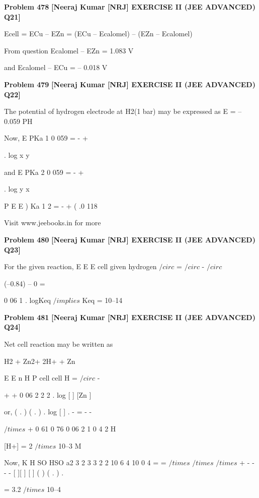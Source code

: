 \begin{problembox}
\textbf{Problem 478} \hfill \textbf{[Neeraj Kumar [NRJ] EXERCISE II (JEE ADVANCED) Q21]}
\label{q:ext-nrj_all_questions-478}

Ecell = ECu -- EZn = (ECu -- Ecalomel) -- (EZn -- Ecalomel)
 
 From question Ecalomel -- EZn = 1.083 V
 
 and Ecalomel -- ECu = -- 0.018 V
\end{problembox}

\begin{problembox}
\textbf{Problem 479} \hfill \textbf{[Neeraj Kumar [NRJ] EXERCISE II (JEE ADVANCED) Q22]}
\label{q:ext-nrj_all_questions-479}

The potential of hydrogen electrode at H2(1 bar) 
may be expressed as E = -- 0.059 PH
 
 Now, E
PKa
1
0 059
= -
+
 
  
 
  
.
log x
y 
 
 and E
PKa
2
0 059
= -
+
 
  
 
  
.
log y
x
 
   P
E
E )
Ka
1
2
= -
+
(
.0 118
 
 
Visit www.jeebooks.in for more
\end{problembox}

\begin{problembox}
\textbf{Problem 480} \hfill \textbf{[Neeraj Kumar [NRJ] EXERCISE II (JEE ADVANCED) Q23]}
\label{q:ext-nrj_all_questions-480}

For the given reaction, E
E
E
cell
given
hydrogen
$/circ$
=
$/circ$
-
$/circ$
 
   (--0.84) -- 0 =
 
0 06
1
.
logKeq $/implies$ Keq = 10--14
\end{problembox}

\begin{problembox}
\textbf{Problem 481} \hfill \textbf{[Neeraj Kumar [NRJ] EXERCISE II (JEE ADVANCED) Q24]}
\label{q:ext-nrj_all_questions-481}

Net cell reaction may be written as 
 
 H2 + Zn2+   2H+ + Zn
 
 
E
E
n
H
P
cell
cell
H
=
$/circ$
-
 
+
+
0 06
2
2
2
.
log
[
]
[Zn
]
 
 or, (
.
)
(
.
)
.
log [
]
.
-
= -
-
 
$/times$
+
0 61
0 76
0 06
2
1
0 4
2
H
 
   [H+] = 2 $/times$ 10--3 M
 
 Now, K
H
SO
HSO
a2
3
2
3
3
2
2
10
6 4
10
0 4
=
=
$/times$
$/times$
$/times$
+
-
-
-
-
[
][
]
[
]
(
)
( .
)
.
 
= 3.2 $/times$ 10--4
\end{problembox}

